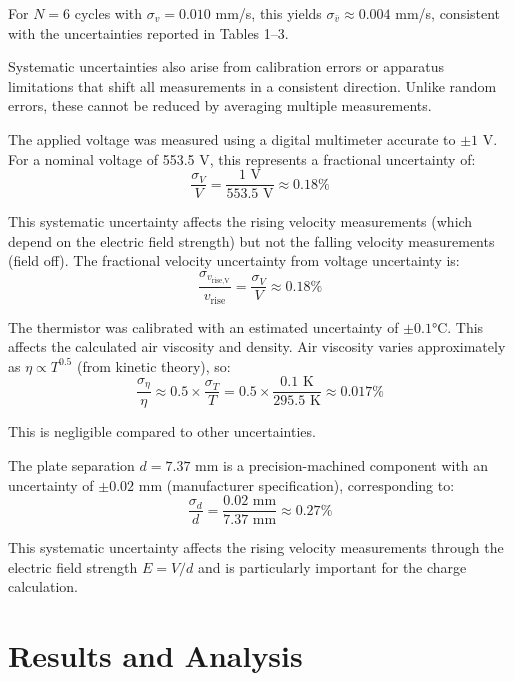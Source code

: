 \documentclass[11pt]{article}
\begin{document}
For $N = 6$ cycles with $\sigma_v = 0.010$ mm/s, this yields $\sigma_{\bar{v}} \approx 0.004$ mm/s, consistent with the uncertainties reported in Tables 1--3.

Systematic uncertainties also arise from calibration errors or apparatus limitations that shift all measurements in a consistent direction. Unlike random errors, these cannot be reduced by averaging multiple measurements.

The applied voltage was measured using a digital multimeter accurate to $\pm 1$ V. For a nominal voltage of 553.5 V, this represents a fractional uncertainty of:
\begin{equation}
\frac{\sigma_V}{V} = \frac{1 \text{ V}}{553.5 \text{ V}} \approx 0.18\%
\end{equation}

This systematic uncertainty affects the rising velocity measurements (which depend on the electric field strength) but not the falling velocity measurements (field off). The fractional velocity uncertainty from voltage uncertainty is:
\begin{equation}
\frac{\sigma_{v_{\text{rise,V}}}}{v_{\text{rise}}} = \frac{\sigma_V}{V} \approx 0.18\%
\end{equation}

The thermistor was calibrated with an estimated uncertainty of $\pm 0.1$°C. This affects the calculated air viscosity and density. Air viscosity varies approximately as $\eta \propto T^{0.5}$ (from kinetic theory), so:
\begin{equation}
\frac{\sigma_\eta}{\eta} \approx 0.5 \times \frac{\sigma_T}{T} = 0.5 \times \frac{0.1 \text{ K}}{295.5 \text{ K}} \approx 0.017\%
\end{equation}

This is negligible compared to other uncertainties.

The plate separation $d = 7.37$ mm is a precision-machined component with an uncertainty of $\pm 0.02$ mm (manufacturer specification), corresponding to:
\begin{equation}
\frac{\sigma_d}{d} = \frac{0.02 \text{ mm}}{7.37 \text{ mm}} \approx 0.27\%
\end{equation}

This systematic uncertainty affects the rising velocity measurements through the electric field strength $E = V/d$ and is particularly important for the charge calculation.

\newpage
\section{Results and Analysis}
\end{document}
